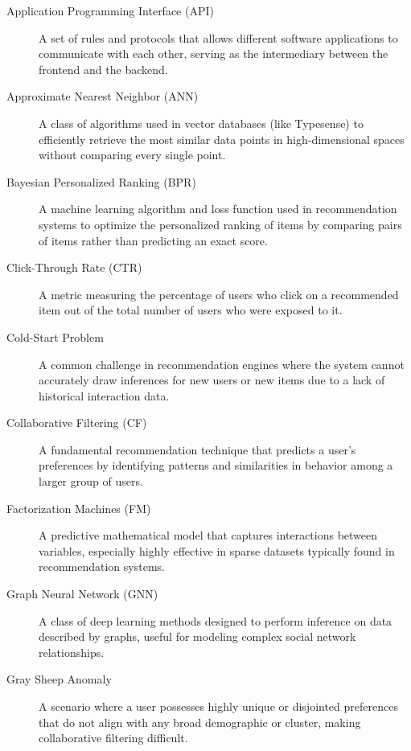 \documentclass[12pt,a4paper]{report}
\begin{document}
\begin{description}
\item[Application Programming Interface (API)] A set of rules and protocols that allows different software applications to communicate with each other, serving as the intermediary between the frontend and the backend.

\item[Approximate Nearest Neighbor (ANN)] A class of algorithms used in vector databases (like Typesense) to efficiently retrieve the most similar data points in high-dimensional spaces without comparing every single point.

\item[Bayesian Personalized Ranking (BPR)] A machine learning algorithm and loss function used in recommendation systems to optimize the personalized ranking of items by comparing pairs of items rather than predicting an exact score.

\item[Click-Through Rate (CTR)] A metric measuring the percentage of users who click on a recommended item out of the total number of users who were exposed to it.

\item[Cold-Start Problem] A common challenge in recommendation engines where the system cannot accurately draw inferences for new users or new items due to a lack of historical interaction data.

\item[Collaborative Filtering (CF)] A fundamental recommendation technique that predicts a user's preferences by identifying patterns and similarities in behavior among a larger group of users.

\item[Factorization Machines (FM)] A predictive mathematical model that captures interactions between variables, especially highly effective in sparse datasets typically found in recommendation systems.

\item[Graph Neural Network (GNN)] A class of deep learning methods designed to perform inference on data described by graphs, useful for modeling complex social network relationships.

\item[Gray Sheep Anomaly] A scenario where a user possesses highly unique or disjointed preferences that do not align with any broad demographic or cluster, making collaborative filtering difficult.


\end{description}
\end{document}
